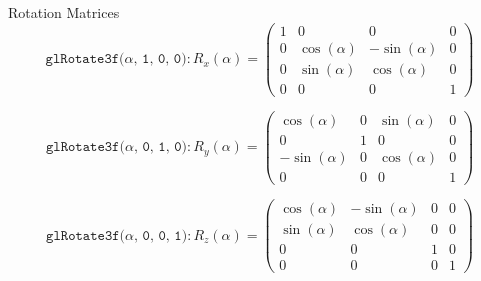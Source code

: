 \documentclass[xcolor=dvipsnames,t]{beamer}
\begin{document}
\begin{frame}{Rotation Matrices} 
        \begin{equation*} 
        \texttt{glRotate3f($\alpha$, 1, 0, 0)} :
            R_x(\alpha) = \left(
                        \begin{array}{cccc}
                            1   & 0             & 0                 & 0 \\
                            0   & \cos(\alpha)  & -\sin(\alpha)     & 0 \\
                            0   & \sin(\alpha)  &  \cos(\alpha)    & 0 \\
                            0   & 0             & 0                 & 1
                        \end{array} 
                    \right)
        \end{equation*} 

        \begin{equation*} 
        \texttt{glRotate3f($\alpha$, 0, 1, 0)} :
            R_y(\alpha) = \left(
                        \begin{array}{cccc}
                            \cos(\alpha)    & 0             & \sin(\alpha)      & 0 \\
                            0               & 1             & 0                 & 0 \\
                            -\sin(\alpha)   & 0             & \cos(\alpha)      & 0 \\
                            0               & 0             & 0                 & 1
                        \end{array} 
                    \right)
        \end{equation*} 

        \begin{equation*} 
        \texttt{glRotate3f($\alpha$, 0, 0, 1)} :
            R_z(\alpha) = \left(
                        \begin{array}{cccc}
                            \cos(\alpha)    & -\sin(\alpha) & 0 & 0 \\
                            \sin(\alpha)    & \cos(\alpha)  & 0 & 0 \\
                            0               & 0             & 1 & 0 \\
                            0               & 0             & 0 & 1
                        \end{array} 
                    \right)
        \end{equation*} 
\end{frame} 
\end{document}
